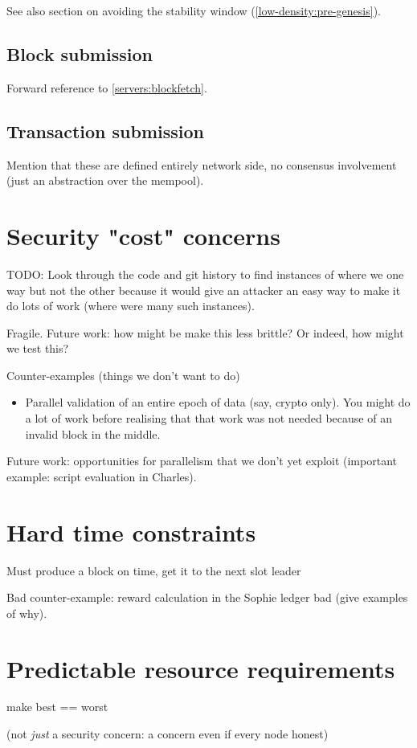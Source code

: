 See also section on avoiding the stability window
(\cref{low-density:pre-genesis}).

\subsection{Block submission}
\label{nonfunctional:network:blocksubmission}

Forward reference to \cref{servers:blockfetch}.

\subsection{Transaction submission}
\label{nonfunctional:network:txsubmission}

Mention that these are defined entirely network side, no consensus involvement
(just an abstraction over the mempool).

\section{Security "cost" concerns}

TODO: Look through the code and git history to find instances of where we
one way but not the other because it would give an attacker an easy way to
make it do lots of work (where were many such instances).

Fragile. Future work: how might be make this less brittle?
Or indeed, how might we test this?

Counter-examples (things we don't want to do)

\begin{itemize}
\item Parallel validation of an entire epoch of data (say, crypto only).
You might do a lot of work before realising that that work was not needed because
of an invalid block in the middle.
\end{itemize}

Future work: opportunities for parallelism that we don't yet exploit
(important example: script evaluation in Charles).

\section{Hard time constraints}

Must produce a block on time, get it to the next slot leader

Bad counter-example: reward calculation in the Sophie ledger bad
(give examples of why).

\section{Predictable resource requirements}
\label{nonfunctional:best-is-worst}

make best == worst

(not \emph{just} a security concern: a concern even if every node honest)

